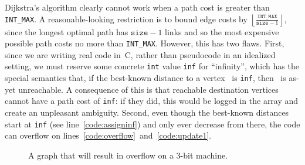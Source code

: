 Dijkstra's algorithm clearly cannot work when a path
cost is greater than \texttt{INT\_MAX}.  A reasonable-looking restriction 
is to bound edge costs by 
$\left\lfloor\frac{\texttt{INT\_MAX}}{\texttt{size}-1}\right\rfloor$, since 
the longest optimal path has $\texttt{size}-1$ links and so the 
most expensive possible path costs no more than \texttt{INT\_MAX}.  
However, this has two flaws.  First, since we are writing real code in~C, 
rather than pseudocode in an idealized setting, we must reserve some 
concrete \texttt{int} value \texttt{inf} for ``infinity'', which has 
the special semantics that, if the best-known distance to a vertex~
is \texttt{inf}, then~ is as-yet unreachable. 
A consequence of this is that reachable destination vertices cannot have a 
path cost of \texttt{inf}: if they did, this would be logged in the 
 array and create an unpleasant ambiguity. 
Second, even though the best-known distances start at \texttt{inf} 
(see line~\ref{code:assigninf}) and only ever decrease from there, the code can 
overflow on lines~\ref{code:overflow}~and~\ref{code:update1}.

\begin{figure}[t]
\centering
{}
\caption{A graph that will result in overflow on a 3-bit machine.}
\label{fig:overflow}
\end{figure}

